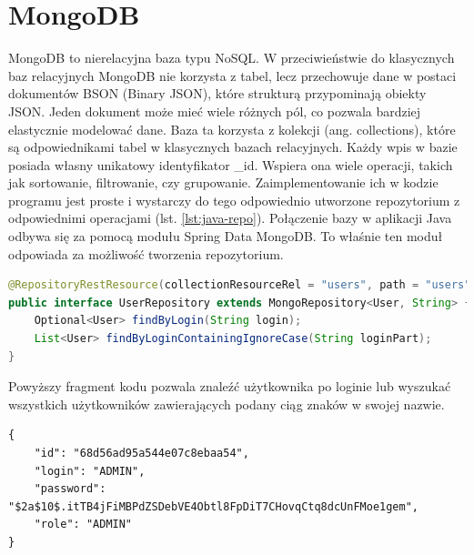 \section{MongoDB}
MongoDB to nierelacyjna baza typu NoSQL. W przeciwieństwie do klasycznych baz relacyjnych MongoDB nie korzysta z tabel, lecz przechowuje dane w postaci dokumentów BSON (Binary JSON), które strukturą przypominają obiekty JSON.
Jeden dokument może mieć wiele różnych pól, co pozwala bardziej elastycznie modelować dane. Baza ta korzysta z kolekcji (ang. collections), które są odpowiednikami tabel w klasycznych bazach relacyjnych. Każdy wpis w bazie posiada własny unikatowy identyfikator \_id. Wspiera ona wiele operacji, takich jak sortowanie, filtrowanie, czy grupowanie. Zaimplementowanie ich w kodzie programu jest proste i wystarczy do tego odpowiednio utworzone repozytorium z odpowiednimi operacjami (lst. \ref{lst:java-repo}). Połączenie bazy w aplikacji Java odbywa się za pomocą modułu Spring Data MongoDB. To właśnie ten moduł odpowiada za możliwość tworzenia repozytorium.
\begin{lstlisting}[language={Java}, caption={Przykładowe repozytorium w Javie}, label={lst:java-repo}]
@RepositoryRestResource(collectionResourceRel = "users", path = "users")
public interface UserRepository extends MongoRepository<User, String> {
	Optional<User> findByLogin(String login);
	List<User> findByLoginContainingIgnoreCase(String loginPart);	
}	
\end{lstlisting}
Powyższy fragment kodu pozwala znaleźć użytkownika po loginie lub wyszukać wszystkich użytkowników zawierających podany ciąg znaków w swojej nazwie.
\begin{lstlisting}[caption={Przykladowy dokument z kolekcji}, label={lst:MongoDB-doc}]
{
	"id": "68d56ad95a544e07c8ebaa54",
	"login": "ADMIN",
	"password": "$2a$10$.itTB4jFiMBPdZSDebVE4Obtl8FpDiT7CHovqCtq8dcUnFMoe1gem",
	"role": "ADMIN"
}
\end{lstlisting}
